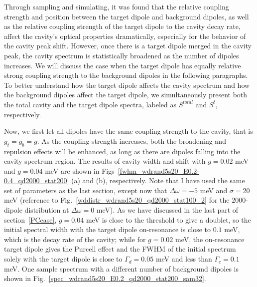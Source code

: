 Through sampling and simulating, it was found that the relative coupling strength and position between the target dipole and background dipoles, as well as the relative coupling strength of the target dipole to the cavity decay rate, affect the cavity's optical properties dramatically, especially for the behavior of the cavity peak shift. However, once there is a target dipole merged in the cavity peak, the cavity spectrum is statistically broadened as the number of dipoles increases. We will discuss the case when the target dipole has equally relative strong coupling strength to the background dipoles in the following paragraphs. To better understand how the target dipole affects the cavity spectrum and how the background dipoles affect the target dipole, we simultaneously present both the total cavity and the target dipole spectra, labeled as $S^{total}$ and $S^{t}$, respectively.


Now, we first let all dipoles have the same coupling strength to the cavity, that is $g_t=g_b=g$. As the coupling strength increases, both the broadening and repulsion effects will be enhanced, as long as there are dipoles falling into the cavity spectrum region. The results of cavity width and shift with $g=0.02$ meV and $g=0.04$ meV are shown in Figs~\ref{fwhm_wdrand5s20_E0.2-0.4_qd2000_stat200} (a) and (b), respectively. Note that I have used the same set of parameters as the last section, except now that $\Delta\omega=-5$ meV and $\sigma=20$ meV (reference to Fig.~\ref{wddistr_wdrand5s20_qd2000_stat100_2} for the $2000$-dipole distribution at $\Delta\omega=0$ meV). As we have discussed in the last part of section~\ref{PCcase}, $g=0.04$ meV is close to the threshold to give a doublet, so the initial spectral width with the target dipole on-resonance is close to $0.1$ meV, which is the decay rate of the cavity; while for $g=0.02$ meV, the on-resonance target dipole gives the Purcell effect and the FWHM of the initial spectrum solely with the target dipole is close to $\Gamma_d=0.05$ meV and less than $\Gamma_c=0.1$ meV. One sample spectrum with a different number of background dipoles is shown in Fig.~\ref{spec_wdrand5s20_E0.2_qd2000_stat200_sam32}.

